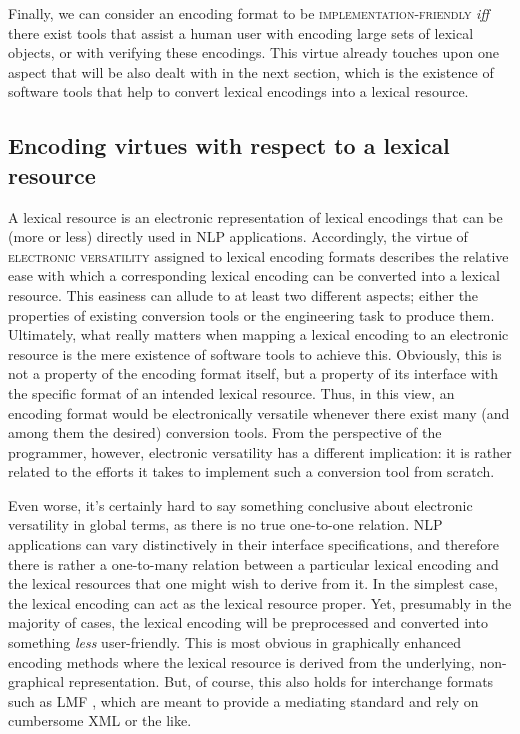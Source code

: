 \documentclass[output=paper
,modfonts
,nonflat
,biblatexbackend=biber
]{langsci/langscibook}
\begin{document}
Finally, we can consider an encoding format to be \textsc{implementation-friendly} \textit{iff} the\-re exist tools that assist a human user with encoding large sets of lexical objects, or with verifying these encodings. This virtue already touches upon one aspect that will be also dealt with in the next section, which is the existence of software tools that help to convert lexical encodings into a lexical resource. 

\subsection{Encoding virtues with respect to a lexical resource}
\label{lic:sec:virtues-resource}

  A lexical resource is an electronic representation of lexical encodings that can be (more or less) directly used in NLP applications. Accordingly, the virtue of \textsc{electronic versatility} assigned to lexical encoding formats describes the relative ease with which a corresponding lexical encoding can be converted into a lexical resource. This easiness can allude to at least two different aspects; either the properties of existing conversion tools or the engineering task to produce them. Ultimately, what really matters when mapping a lexical encoding to an electronic resource is the mere existence of software tools to achieve this. Obviously, this is not a property of the encoding format itself, but a property of its interface with the specific format of an intended lexical resource. Thus, in this view, an encoding format would be electronically versatile whenever there exist many (and among them the desired) conversion tools. From the perspective of the programmer, however, electronic versatility has a different implication: it is rather related to the efforts it takes to implement such a conversion tool from scratch.

  Even worse, it's certainly hard to say something conclusive about electronic versatility in global terms, as there is no true one-to-one relation. NLP applications can vary distinctively in their interface specifications, and therefore there is rather a one-to-many relation between a particular lexical encoding and the lexical resources that one might wish to derive from it. In the simplest case, the lexical encoding can act as the lexical resource proper. Yet, presumably in the majority of cases, the lexical encoding will be preprocessed and converted into something \textit{less} user-friendly. This is most obvious in graphically enhanced encoding methods where the lexical resource is derived from the underlying, non-graphical representation. But, of course, this also holds for interchange formats such as LMF \citep{francopoulo:etal:06}, which are meant to provide a mediating standard and rely on cumbersome XML or the like. 
\end{document}
